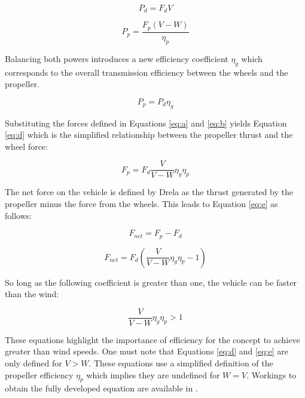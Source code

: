 \begin{equation}
P_{d}=F_{d} V
\label{eq:a}
\end{equation}

\begin{equation}
P_{p}=\frac{F_{p}(V-W)}{\eta_{p}}
\label{eq:b}
\end{equation}

Balancing both powers introduces a new efficiency coefficient $\eta_g$ which corresponds to the overall transmission efficiency between the wheels and the propeller.

\begin{equation}
    P_p = P_d \eta_g
    \label{eq:c}
\end{equation}

Substituting the forces defined in Equations \ref{eq:a} and \ref{eq:b} yields Equation \ref{eq:d} which is the simplified relationship between the propeller thrust and the wheel force:

\begin{equation}
F_{p}=F_{d} \frac{V}{V-W} \eta_{g} \eta_p
\label{eq:d}
\end{equation}

The net force on the vehicle is defined by Drela as the thrust generated by the propeller minus the force from the wheels. This leads to Equation \ref{eq:e} as follows:

\begin{equation}
    F_{net} = F_p - F_d
    \label{eq:fnet}
\end{equation}

\begin{equation}
F_{n e t}=F_{d}\left(\frac{V}{V-W} \eta_{g} \eta_{p}-1\right)
\label{eq:e}
\end{equation}

So long as the following coefficient is greater than one, the vehicle can be faster than the wind:

\begin{equation}
\frac{V}{V-W} \eta_{g} \eta_{p}>1
\label{eq:f}
\end{equation}

These equations highlight the importance of efficiency for the concept to achieve greater than wind speeds. One must note that Equations \ref{eq:d} and \ref{eq:e} are only defined for $V>W$. These equations use a simplified definition of the propeller efficiency $\eta_p$ which implies they are undefined for $W=V$. Workings to obtain the fully developed equation are available in \cite{drela20dead}.

